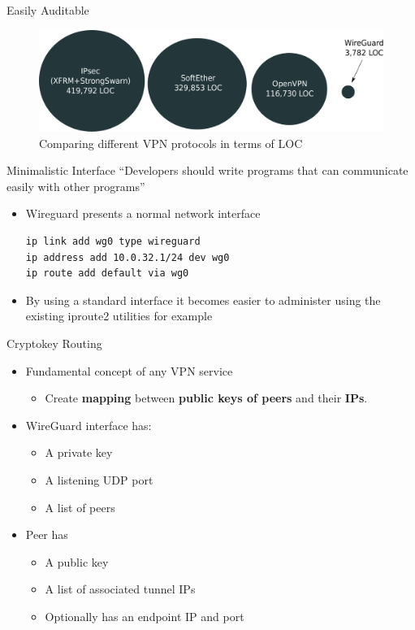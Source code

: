 \documentclass[xcolor=table]{beamer}
\begin{document}
    \begin{frame}{Easily Auditable}
        \begin{figure}
            \includegraphics[width=\textwidth]{vpn_compare.pdf}
            \caption{Comparing different VPN protocols in terms of LOC}
        \end{figure}
    \end{frame}
    \begin{frame}[fragile]{Minimalistic Interface}
    ``Developers should write programs that can communicate easily with other programs''
    \\[5pt]
        \begin{itemize}
            \item Wireguard presents a normal network interface
                \begin{verbatim}
ip link add wg0 type wireguard
ip address add 10.0.32.1/24 dev wg0
ip route add default via wg0
                \end{verbatim}
            \item By using a standard interface it becomes easier to administer using the existing iproute2 utilities for example
        \end{itemize}
    \end{frame}
    \begin{frame}{Cryptokey Routing}
        \begin{itemize}
            \item Fundamental concept of any VPN service
                \begin{itemize}
                    \item Create \textbf{mapping} between \textbf{public keys of peers} and their \textbf{IPs}.
                \end{itemize}
            \item WireGuard interface has:
                \begin{itemize}
                    \item A private key
                    \item A listening UDP port
                    \item A list of peers
                \end{itemize}
            \item Peer has
                \begin{itemize}
                    \item A public key
                    \item A list of associated tunnel IPs
                    \item Optionally has an endpoint IP and port
                \end{itemize}
        \end{itemize}
    \end{frame}
\end{document}
